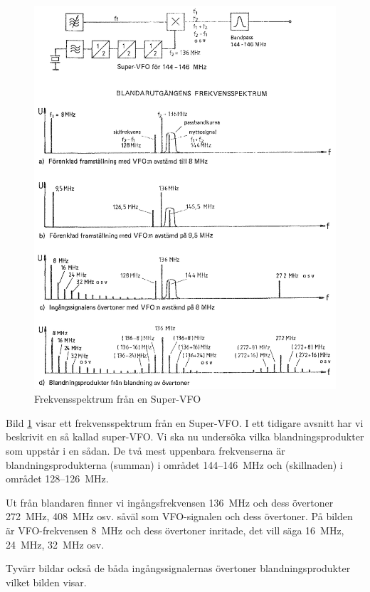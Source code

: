 \begin{figure}
\includegraphics[width=\textwidth]{images/cropped_pdfs/bild_2_3-88.pdf}
\caption{Frekvensspektrum från en Super-VFO}
\label{fig:BildII3-88}
\end{figure}

Bild \ref{fig:BildII3-88} visar ett frekvensspektrum från en Super-VFO.
I ett tidigare avsnitt har vi beskrivit en så kallad super-VFO.
Vi ska nu undersöka vilka blandningsprodukter som uppstår i en sådan.
De två mest uppenbara frekvenserna är blandningsprodukterna (summan) i
området 144--146~MHz och (skillnaden) i området 128--126~MHz.

Ut från blandaren finner vi ingångsfrekvensen 136~MHz och dess
övertoner 272~MHz, 408~MHz osv. såväl som VFO-signalen och dess
övertoner.
På bilden är VFO-frekvensen 8~MHz och dess övertoner inritade, det vill
säga 16~MHz, 24~MHz, 32~MHz osv.

Tyvärr bildar också de båda ingångssignalernas övertoner
blandningsprodukter vilket bilden visar.

